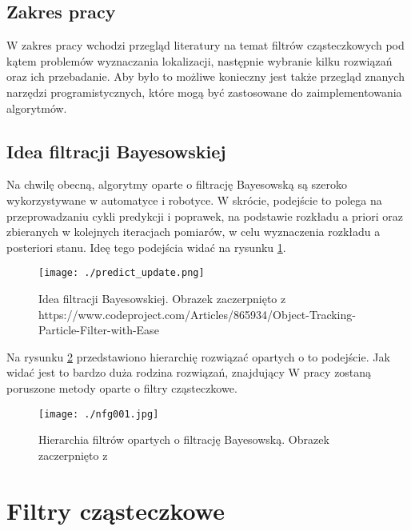 \documentclass[10pt,a4paper]{article}
\begin{document}
\subsection{Zakres pracy}
W zakres pracy wchodzi przegląd literatury na temat filtrów cząsteczkowych pod kątem problemów wyznaczania lokalizacji, następnie wybranie kilku rozwiązań oraz ich przebadanie. Aby było to możliwe konieczny jest także przegląd znanych narzędzi programistycznych, które mogą być zastosowane do zaimplementowania algorytmów.

\subsection{Idea filtracji Bayesowskiej}
Na chwilę obecną, algorytmy oparte o filtrację Bayesowską są szeroko wykorzystywane w automatyce i robotyce. W skrócie, podejście to polega na przeprowadzaniu cykli predykcji i poprawek, na podstawie rozkładu a priori oraz zbieranych w kolejnych iteracjach pomiarów, w celu wyznaczenia rozkładu a posteriori stanu. Ideę tego podejścia widać na rysunku \ref{bayes_fil_idea}. 
\begin{figure}[H]
	\begin{center}
		\texttt{[image: ./predict\_update.png]}
		\caption{Idea filtracji Bayesowskiej. Obrazek zaczerpnięto z https://www.codeproject.com/Articles/865934/Object-Tracking-Particle-Filter-with-Ease}
		\label{bayes_fil_idea}
	\end{center}
\end{figure}
Na rysunku \ref{filtr_hier} przedstawiono hierarchię rozwiązać opartych o to podejście. Jak widać jest to bardzo duża rodzina rozwiązań, znajdujący  W pracy zostaną poruszone metody oparte o filtry cząsteczkowe.
\begin{figure}
	\begin{center}
		\texttt{[image: ./nfg001.jpg]}
		\caption{Hierarchia filtrów opartych o filtrację Bayesowską. Obrazek zaczerpnięto z \cite{prac_gui}}
		\label{filtr_hier}
	\end{center}
\end{figure}
\section{Filtry cząsteczkowe}
\end{document}
